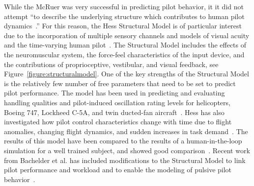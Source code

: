 \documentclass[float=false, crop=false]{standalone}
\begin{document}
While the McRuer was very successful in predicting pilot behavior, it it did not attempt ``to describe the underlying structure which contributes to human pilot dynamics~\cite{Hess1980}.''
For this reason, the Hess Structural Model is of particular interest due to the incorporation of multiple sensory channels and models of visual acuity and the time-varying human pilot~\cite{Hess2009}.
The Structural Model includes the effects of the neuromuscular system, the force-feel characteristics of the input device, and the contributions of proprioceptive, vestibular, and visual feedback, see Figure~\ref{figure:structuralmodel}.
One of the key strengths of the Structural Model is the relatively few number of free parameters that need to be set to predict pilot performance.
The model has been used in predicting and evaluating handling qualities and pilot-induced oscillation rating levels for helicopters, Boeing 747, Lockheed C-5A, and twin ducted-fan aircraft~\cite{Hess2013, Andreea-Irina2014, Grant2015}.
Hess has also investigated how pilot control characteristics change with time due to flight anomalies, changing flight dynamics, and sudden increases in task demand~\cite{Hess2009, Hess2016}.
The results of this model have been compared to the results of a human-in-the-loop simulation for a well trained subject, and showed good comparison~\cite{Hess2016}.
Recent work from Bachelder et al. has included modifications to the Structural Model to link pilot performance and workload and to enable the modeling of pulsive pilot behavior~\cite{Bachelder2017, Bachelder2018}.
\end{document}
